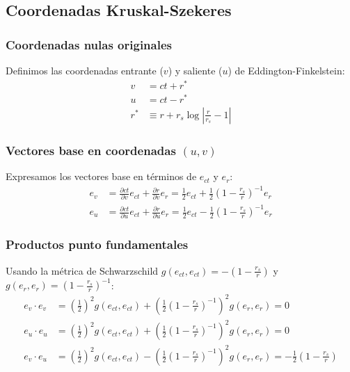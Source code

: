\subsection{Coordenadas Kruskal-Szekeres}

\subsubsection{Coordenadas nulas originales}
Definimos las coordenadas entrante (\(v\)) y saliente (\(u\)) de Eddington-Finkelstein:
\begin{equation}
    \begin{aligned}
        v   & = ct + r^*                                      \\
        u   & = ct - r^*                                      \\
        r^* & \equiv r + r_s \log\left|\frac{r}{r_s}-1\right|
    \end{aligned}
\end{equation}

\subsubsection{Vectores base en coordenadas \( (u, v) \)}
Expresamos los vectores base en términos de \( e_{ct} \) y \( e_r \):
\begin{equation}
    \begin{aligned}
        e_v & = \frac{\partial ct}{\partial v}e_{ct} + \frac{\partial r}{\partial v}e_r = \frac{1}{2}e_{ct} + \frac{1}{2}\left(1-\frac{r_s}{r}\right)^{-1}e_r \\
        e_u & = \frac{\partial ct}{\partial u}e_{ct} + \frac{\partial r}{\partial u}e_r = \frac{1}{2}e_{ct} - \frac{1}{2}\left(1-\frac{r_s}{r}\right)^{-1}e_r
    \end{aligned}
\end{equation}

\subsubsection{Productos punto fundamentales}
Usando la métrica de Schwarzschild \( g(e_{ct},e_{ct}) = -\left(1-\frac{r_s}{r}\right) \) y \( g(e_r,e_r) = \left(1-\frac{r_s}{r}\right)^{-1} \):
\begin{equation}
    \begin{aligned}
        e_v \cdot e_v & = \left(\frac{1}{2}\right)^2 g(e_{ct},e_{ct}) + \left(\frac{1}{2}\left(1-\frac{r_s}{r}\right)^{-1}\right)^2 g(e_r,e_r) = 0                                        \\
        e_u \cdot e_u & = \left(\frac{1}{2}\right)^2 g(e_{ct},e_{ct}) + \left(\frac{1}{2}\left(1-\frac{r_s}{r}\right)^{-1}\right)^2 g(e_r,e_r) = 0                                        \\
        e_v \cdot e_u & = \left(\frac{1}{2}\right)^2 g(e_{ct},e_{ct}) - \left(\frac{1}{2}\left(1-\frac{r_s}{r}\right)^{-1}\right)^2 g(e_r,e_r) = -\frac{1}{2}\left(1-\frac{r_s}{r}\right)
    \end{aligned}
\end{equation}

